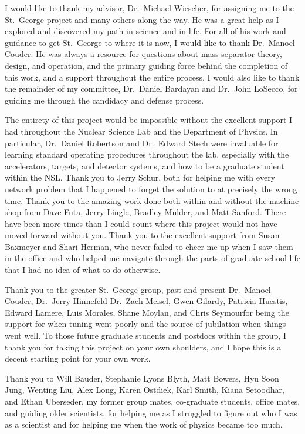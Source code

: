 \begin{acknowledge}

I would like to thank my advisor, Dr.\ Michael Wiescher, for assigning me to
the St.\ George project and many others along the way. He was a great help as
I explored and discovered my path in science and in life.
For all of his work and guidance to get St.\ George to where it is now, I would
like to thank Dr.\ Manoel Couder. He was always a resource for questions
about mass separator theory, design, and operation, and the primary guiding
force behind the completion of this work, and a support throughout the
entire process.
I would also like to thank the remainder of my committee, Dr.\ Daniel Bardayan
and Dr.\ John LoSecco, for guiding me through the candidacy and defense
process.

The entirety of this project would be impossible without the excellent support
I had throughout the Nuclear Science Lab and the Department of Physics.
In particular,
Dr.\ Daniel Robertson
and Dr.\ Edward Stech were invaluable for learning standard operating
procedures throughout the lab, especially with the accelerators, targets, and
detector systems, and how to be a graduate student within the NSL.
Thank you to Jerry Schur, both for helping me with every network problem that
I happened to forget the solution to at precisely the wrong time.
Thank you to the amazing work done both within and without the machine shop
from
Dave Futa,
Jerry Lingle,
Bradley Mulder,
and Matt Sanford. There have been more times than I could count where this
project would not have moved forward without you.
Thank you to the excellent support from
Susan Baxmeyer
and Shari Herman, who never failed to cheer me up when I saw them in the office
and who helped me navigate through the parts of graduate school life that I had
no idea of what to do otherwise.

Thank you to the greater St.\ George group, past and present\textemdash{}
Dr.\ Manoel Couder,
Dr.\ Jerry Hinnefeld
Dr.\ Zach Meisel,
Gwen Gilardy,
Patricia Huestis,
Edward Lamere,
Luis Morales,
Shane Moylan,
and Chris Seymour\textemdash{}for being the support for when tuning went
poorly and the source of jubilation when things went well. To those future
graduate students and postdocs within the group, I thank you for taking this
project on your own shoulders, and I hope this is a decent starting point for
your own work.

Thank you to
Will Bauder,
Stephanie Lyons Blyth,
Matt Bowers,
Hyu Soon Jung,
Wenting Liu,
Alex Long,
Karen Ostdiek,
Karl Smith,
Kiana Setoodhar,
and Ethan Uberseder,
my former group mates, co-graduate students, office mates, and guiding
older scientists, for helping me as I struggled to figure out who I was as a
scientist and for helping me when the work of physics became too much.


\end{acknowledge}
